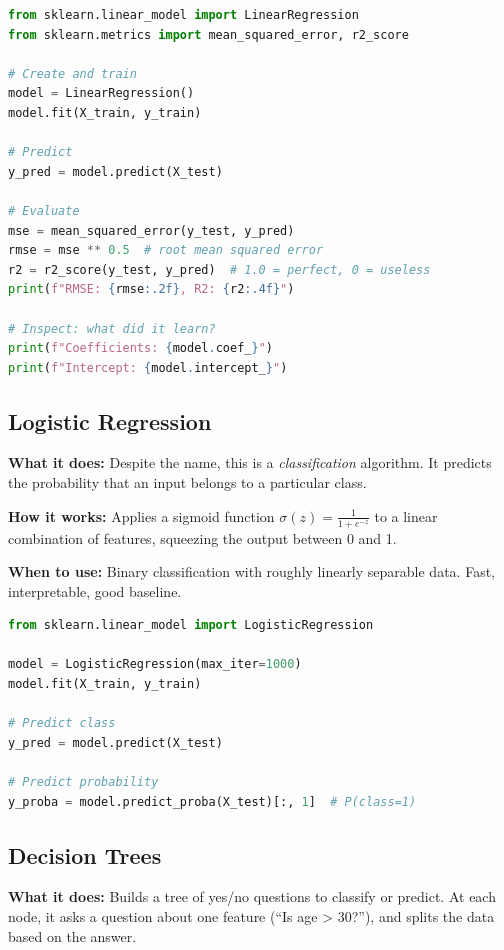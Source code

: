 \documentclass[12pt, a4paper, oneside]{book}
\begin{document}
\begin{lstlisting}[language=Python, caption={Linear regression with scikit-learn}]
from sklearn.linear_model import LinearRegression
from sklearn.metrics import mean_squared_error, r2_score

# Create and train
model = LinearRegression()
model.fit(X_train, y_train)

# Predict
y_pred = model.predict(X_test)

# Evaluate
mse = mean_squared_error(y_test, y_pred)
rmse = mse ** 0.5  # root mean squared error
r2 = r2_score(y_test, y_pred)  # 1.0 = perfect, 0 = useless
print(f"RMSE: {rmse:.2f}, R2: {r2:.4f}")

# Inspect: what did it learn?
print(f"Coefficients: {model.coef_}")
print(f"Intercept: {model.intercept_}")
\end{lstlisting}

\subsection{Logistic Regression}

\textbf{What it does:} Despite the name, this is a \emph{classification} algorithm. It predicts the probability that an input belongs to a particular class.

\textbf{How it works:} Applies a sigmoid function $\sigma(z) = \frac{1}{1 + e^{-z}}$ to a linear combination of features, squeezing the output between 0 and 1.

\textbf{When to use:} Binary classification with roughly linearly separable data. Fast, interpretable, good baseline.

\begin{lstlisting}[language=Python, caption={Logistic regression}]
from sklearn.linear_model import LogisticRegression

model = LogisticRegression(max_iter=1000)
model.fit(X_train, y_train)

# Predict class
y_pred = model.predict(X_test)

# Predict probability
y_proba = model.predict_proba(X_test)[:, 1]  # P(class=1)
\end{lstlisting}

\subsection{Decision Trees}

\textbf{What it does:} Builds a tree of yes/no questions to classify or predict. At each node, it asks a question about one feature (``Is age > 30?''), and splits the data based on the answer.
\end{document}
